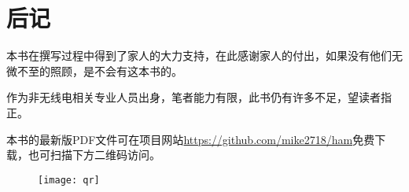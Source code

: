 \chapter*{后记}

本书在撰写过程中得到了家人的大力支持，在此感谢家人的付出，如果没有他们无微不至的照顾，是不会有这本书的。

作为非无线电相关专业人员出身，笔者能力有限，此书仍有许多不足，望读者指正。

本书的最新版PDF文件可在项目网站\url{https://github.com/mike2718/ham}免费下载，也可扫描下方二维码访问。

\begin{figure}[h]
  \texttt{[image: qr]}
  \centering
\end{figure}

\newpage
